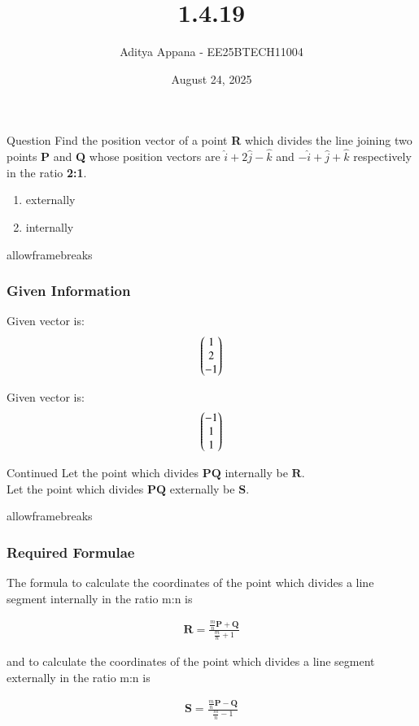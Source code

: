 \documentclass{beamer}
\title %
{1.4.19}
\date{August 24, 2025}
\author %
{Aditya Appana - EE25BTECH11004}
\begin{document}
\frame{\titlepage}
\begin{frame}{Question}
Find the position vector of a point \textbf{R} which divides the line joining two points \textbf{P} and \textbf{Q} whose position vectors are $ \hat{i} + 2\hat{j} - \hat{k}$ and $-\hat{i} + \hat{j} + \hat{k} $ respectively in the ratio \textbf{2:1}.
\begin{enumerate}[label=(\alph*)]
    \item externally
    \item internally   
\end{enumerate}

\end{frame}
\begin{frame}{allowframebreaks}
\frametitle{Given Information}

    \centering
    
    \label{tab:parameters}
    
    
    Given vector  is: \begin{align}
    \begin{pmatrix} 1 \\ 2\\ -1\end{pmatrix}
    \end{align}
    

    Given vector  is: \begin{align}\begin{pmatrix} -1 \\ 1 \\ 1 \end{pmatrix}\end{align}
    \label{0.2}

   
\end{frame}


\begin{frame}{Continued}
Let the point which divides $\mathbf{PQ}$ internally be $\mathbf{R}$. \\

Let the point which divides $\mathbf{PQ}$ externally be $\mathbf{S}$. \\

\end{frame}

\begin{frame}{allowframebreaks}
\frametitle{Required Formulae}

    The formula to calculate the coordinates of the point which divides a line segment internally in the ratio m:n is 



\begin{align}
    \mathbf{R}=\frac{\frac{m}{n}\mathbf{P}+\mathbf{Q}}{\frac{m}{n}+1}
\end{align}

and to calculate the coordinates of the point which divides a line segment externally in the ratio m:n is 

\begin{align}
    \mathbf{S}=\frac{\frac{m}{n}\mathbf{P}-\mathbf{Q}}{\frac{m}{n}-1}
\end{align}


\end{frame}
\end{document}
